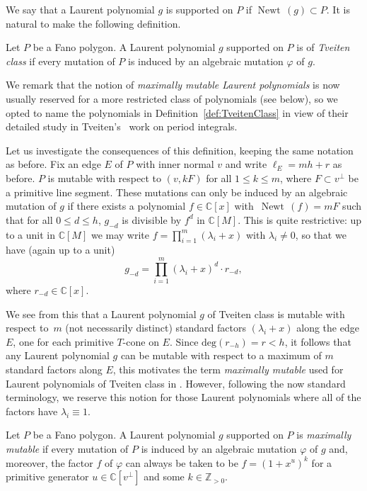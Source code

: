 \documentclass[11pt]{article}
\numberwithin{equation}{section}
\DeclareMathOperator{\Newt}{{Newt \,}}
\newcommand{\CC}{\mathbb{C}}
\newcommand{\ZZ}{\mathbb{Z}}
\begin{document}
We say that a Laurent polynomial $g$ is supported on $P$ if	$\Newt(g) \subset P$.
It is natural to make the following definition.

	\begin{Definition}\label{def:TveitenClass}
Let $P$ be a Fano polygon. A Laurent polynomial $g$ supported on $P$ is of \emph{Tveiten class} if every mutation of $P$ is induced by an algebraic mutation $\varphi$ of $g$.
	\end{Definition}
We remark that the notion of \emph{maximally mutable Laurent polynomials} is now usually reserved for a more restricted class of polynomials (see below), so we opted to name the polynomials in Definition~\ref{def:TveitenClass} in view of their detailed study in Tveiten's~\cite{Tveiten} work on period integrals.

	Let us investigate the consequences of this definition, keeping the same notation as before. Fix an edge $E$ of $P$ with inner normal $v$ and write $\ell_E=mh+r$ as before. $P$ is mutable with respect to $(v, kF)$ for all $1 \leq k \leq m$, where $F \subset v^\perp$ be a primitive line segment.
	These mutations can only be induced by an algebraic mutation of $g$
	if there exists a polynomial $f \in \CC[x]$ with~${\Newt(f)=mF}$ such that for all $0 \leq d \leq h$, $g_{-d}$ is divisible by $f^d$ in $\CC[M]$. This is quite restrictive: up to a unit in $\CC[M]$ we may write
	$f=\prod_{i=1}^{m} (\lambda_i + x)$ with $\lambda_i \neq 0$, so that we have (again up to a unit)
	\[
	g_{-d}=\prod_{i=1}^{m} (\lambda_i + x)^{d} \cdot r_{-d},
	\]
	 where $r_{-d} \in \CC[x]$.

	 We see from this that a Laurent polynomial $g$ of Tveiten class is mutable with respect to~$m$ (not necessarily distinct) standard factors $(\lambda_i + x)$ along the edge $E$, one for each primitive $T$-cone on $E$.
	Since $\text{deg}(r_{-h})=r<h$, it follows that any Laurent polynomial $g$ can be mutable with respect to a maximum of $m$ standard factors along $E$, this motivates the term \emph{maximally mutable} used for Laurent polynomials of Tveiten class in \cite{Tveiten}. However, following the now standard terminology, we reserve this notion for those Laurent polynomials where all of the factors have $\lambda_i \equiv 1$.
	
	\begin{Definition}\label{def:MMLP}
		Let $P$ be a Fano polygon. A Laurent polynomial $g$ supported on $P$ is \emph{maximally mutable} if every mutation of $P$ is induced by an algebraic mutation $\varphi$ of $g$ and, moreover, the factor $f$ of $\varphi$ can always be taken to be $f=(1+x^u)^k$ for a primitive generator $u \in \CC [v^\perp ]$ and some $k\in \ZZ_{>0}$.
	\end{Definition}
\end{document}
